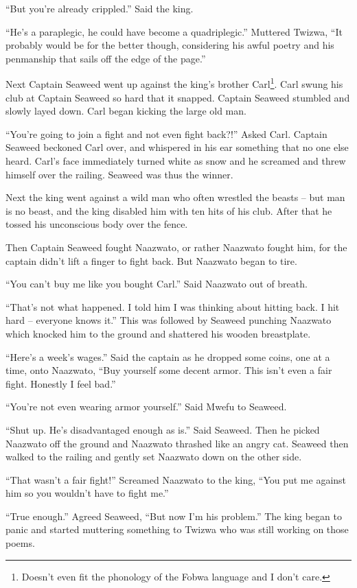 ``But you're already crippled.'' Said the king.

``He's a paraplegic, he could have become a quadriplegic.'' Muttered Twizwa, ``It probably would be for the better though, considering his awful poetry and his penmanship that sails off the edge of the page.''

Next Captain Seaweed went up against the king's brother Carl\footnote{Doesn't even fit the phonology of the Fobwa language and I don't care.}.
Carl swung his club at Captain Seaweed so hard that it snapped. Captain Seaweed stumbled and slowly layed down. Carl began kicking the large old man.

``You're going to join a fight and not even fight back?!'' Asked Carl. Captain Seaweed beckoned Carl over, and whispered in his ear something that no one else heard. Carl's face immediately turned white as snow and he screamed and threw himself over the railing. Seaweed was thus the winner.

Next the king went against a wild man who often wrestled the beasts -- but man is no beast, and the king disabled him with ten hits of his club. After that he tossed his unconscious body over the fence.

Then Captain Seaweed fought Naazwato, or rather Naazwato fought him, for the captain didn't lift a finger to fight back. But Naazwato began to tire.

``You can't buy me like you bought Carl.'' Said Naazwato out of breath.

``That's not what happened. I told him I was thinking about hitting back. I hit hard -- everyone knows it.'' This was followed by Seaweed punching Naazwato which knocked him to the ground and shattered his wooden breastplate.

``Here's a week's wages.'' Said the captain as he dropped some coins, one at a time, onto Naazwato, ``Buy yourself some decent armor. This isn't even a fair fight. Honestly I feel bad.''

``You're not even wearing armor yourself.'' Said Mwefu to Seaweed.

``Shut up. He's disadvantaged enough as is.'' Said Seaweed. Then he picked Naazwato off the ground and Naazwato thrashed like an angry cat. Seaweed then walked to the railing and gently set Naazwato down on the other side.

``That wasn't a fair fight!'' Screamed Naazwato to the king, ``You put me against him so you wouldn't have to fight me.''

``True enough.'' Agreed Seaweed, ``But now I'm his problem.'' The king began to panic and started muttering something to Twizwa who was still working on those poems.

